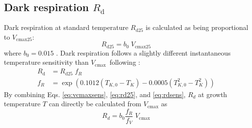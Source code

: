 \documentclass[gmd, manuscript]{copernicus}
\newcommand{\vcmax}{$V_{\text{cmax}}$}
\begin{document}
\subsection{Dark respiration $R_{\mathrm{d}}$}
\label{sec:rd}
Dark respiration at standard temperature $R_{\mathrm{d25}}$ is calculated as being proportional to $V_{\mathrm{cmax25}}$:
\begin{equation}
\label{eq:rd25}
    R_{\mathrm{d25}} = b_0 \; V_{\mathrm{cmax25}}
\end{equation}
where $b_0 = 0.015$ \citep{atkin15}. Dark respiration follows a slightly different instantaneous temperature sensitivity than \vcmax\ following \citet{heskel16}:
\begin{align}
\label{eq:rdsens}
    R_{\mathrm{d}} &=  R_{\mathrm{d25}}\; f_R  \\
    f_R &= \exp \left(  0.1012(T_{K,0}-T_K) - 0.0005(T_{K,0}^2-T_K^2) \right) 
\end{align}
By combining Eqs. \ref{eq:vcmaxsens}, \ref{eq:rd25}, and \ref{eq:rdsens}, $R_d$ at growth temperature $T$ can directly be calculated from $V_{\mathrm{cmax}}$ as
\begin{equation}
\label{eq:rd}
    R_d = b_0 \frac{f_R}{f_V}\;V_{\mathrm{cmax}}
\end{equation}
\end{document}
